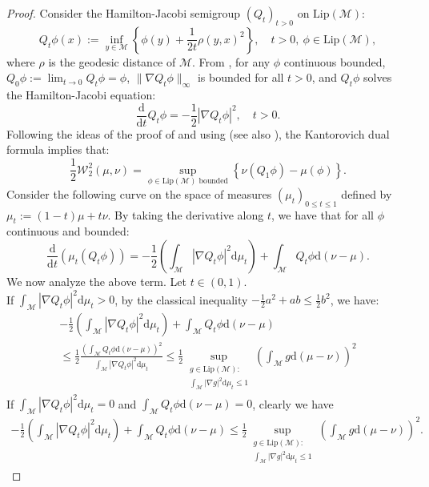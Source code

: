 \documentclass[10pt,a4paper]{article}
\newcommand\cM{\mathcal{M}}
\newcommand\cW{\mathcal{W}}
\newcommand\dd{\mathrm{d}}
\newcommand{\BRA}[1]{{{\left\{#1\right\}}}} %
\newcommand{\PAR}[1]{{{\left(#1\right)}}} %
\begin{document}
\begin{proof}
 Consider the Hamilton-Jacobi semigroup $(Q_t)_{t > 0}$ on $\text{Lip}(\cM)$:
    \[
        Q_t \phi (x) := \inf_{y \in \cM} \left\{ \phi(y) + \frac{1}{2t} \rho(y, x)^2 \right\}, \quad t > 0, \ \phi \in \text{Lip}(\cM),
    \]
    where $\rho$ is the geodesic distance of $\cM$.
    From \cite[Theorem 2.5]{LottVillani2007}, for any $\phi$ continuous bounded, $Q_0 \phi := \lim_{t \to 0} Q_t \phi = \phi$, $\| \nabla Q_t \phi \|_\infty$ is bounded for all $t > 0$, and $Q_t \phi$ solves the Hamilton-Jacobi equation:
    \begin{equation*}
        \frac{\dd}{\dd t} Q_t \phi = -\frac{1}{2} |\nabla Q_t \phi|^2, \quad t > 0.
    \end{equation*}
    Following the ideas of the proof of  \cite[Corollary 2.7.3]{Wang2014} and using \cite[Proposition 1.3.1]{Wang2014} (see also \cite[Theorem 1]{Rachev85}), the Kantorovich dual formula implies that:
    $$
        \frac{1}{2}\cW_2^2(\mu,\nu) = \sup_{\phi \in  \text{Lip}(\cM)\text{ bounded}} \BRA{ \nu(Q_1\phi)- \mu(\phi)}.
    $$
    Consider the following curve on the space of measures $(\mu_t)_{0\le t \le 1}$ defined by
    $\mu_t:=(1-t)\mu +t\nu.$
    By taking the derivative along $t$, we have that for all $\phi$ continuous and bounded:
    $$
        \frac{\dd }{\dd t} \PAR{ \mu_t(Q_t \phi )} = -\frac{1}{2} \PAR{\int_\cM  |\nabla Q_t \phi|^2\dd \mu_t}+\int_\cM Q_t\phi\dd(\nu-\mu).
    $$
     We now analyze the above term. Let $t\in(0,1)$.\\
 If $ \int_\cM  |\nabla Q_t \phi|^2\dd \mu_t >0$, by the classical inequality $-\frac{1}{2}a^2+ab \le \frac{1}{2}b^2$, we have:
    \begin{multline*}
          -\frac{1}{2} \PAR{\int_\cM  |\nabla Q_t \phi|^2\dd \mu_t}+\int_\cM Q_t\phi\dd(\nu-\mu)
        \\
        \le
          \frac{1}{2} \frac{\PAR{\int_\cM Q_t\phi\dd(\nu-\mu)}^2}{\int_\cM  |\nabla Q_t \phi|^2\dd \mu_t} \le \frac{1}{2}\sup_{\substack{g \in \text{Lip}(\cM): \\ \int_\cM | \nabla g|^2 \dd \mu_t \le 1}} \PAR{ \int_\cM g\dd (\mu-\nu)}^2
    \end{multline*}
    If $ \int_\cM  |\nabla Q_t \phi|^2\dd \mu_t =0$ and $\int_\cM Q_t\phi\dd(\nu-\mu)=0$, clearly we have
    \begin{align*}
        -\frac{1}{2} \PAR{\int_\cM  |\nabla Q_t \phi|^2\dd \mu_t}+\int_\cM Q_t\phi\dd(\nu-\mu)
        \le  \frac{1}{2}\sup_{\substack{g \in \text{Lip}(\cM): \\ \int_\cM | \nabla g|^2 \dd \mu_t \le 1}} \PAR{ \int_\cM g\dd (\mu-\nu)}^2.

\end{align*}
\end{proof}
\end{document}

